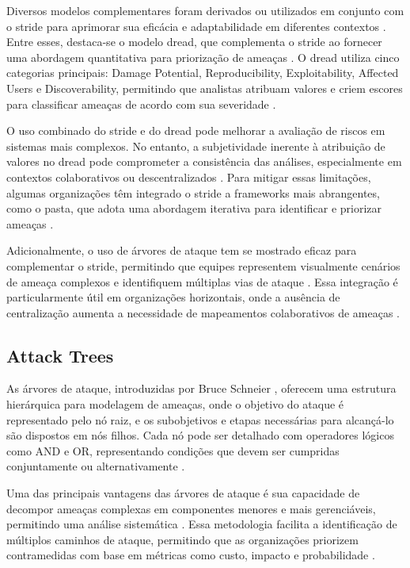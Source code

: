 Diversos modelos complementares foram derivados ou utilizados em
conjunto com o \gls{stride} para aprimorar sua eficácia e adaptabilidade em
diferentes contextos \cite{SoftwareandattackcentricThreatModeling}.
Entre esses, destaca-se o modelo \gls{dread}, que
complementa o \gls{stride} ao fornecer uma abordagem quantitativa para
priorização de ameaças \cite{DREADful}. O \gls{dread} utiliza cinco
categorias principais: Damage Potential, Reproducibility,
Exploitability, Affected Users e Discoverability, permitindo que
analistas atribuam valores e criem escores
para classificar ameaças de acordo com sua severidade
\cite{SoftwareandattackcentricThreatModeling, DREADful}.

O uso combinado do \gls{stride} e do \gls{dread} pode melhorar a avaliação de
riscos em sistemas mais complexos. No entanto, a subjetividade
inerente à atribuição de valores no \gls{dread} pode comprometer a
consistência das análises, especialmente em contextos colaborativos ou
descentralizados \cite{DREADful}. Para mitigar essas limitações,
algumas organizações têm integrado o \gls{stride} a frameworks mais
abrangentes, como o \gls{pasta}, que adota uma abordagem iterativa para identificar e
priorizar ameaças \cite{SoftwareandattackcentricThreatModeling}.

Adicionalmente, o uso de árvores de ataque tem se mostrado eficaz para
complementar o \gls{stride}, permitindo que equipes representem visualmente
cenários de ameaça complexos e identifiquem múltiplas vias de ataque
\cite{FoundationsofAttackTrees}.
Essa integração é particularmente útil em organizações horizontais,
onde a ausência de centralização aumenta a necessidade de mapeamentos
colaborativos de ameaças \cite{ThreatModelingdesigningForSecurity}. 

\subsection{Attack Trees}
\label{subsec:attack_trees}

As árvores de ataque, introduzidas por Bruce Schneier
\cite{AttackTrees}, oferecem uma estrutura hierárquica para modelagem
de ameaças, onde o objetivo do ataque é representado pelo nó raiz, e
os subobjetivos e etapas necessárias para alcançá-lo são dispostos em
nós filhos. Cada nó pode ser detalhado com operadores lógicos como AND
e OR, representando condições que devem ser cumpridas conjuntamente ou
alternativamente \cite{FoundationsofAttackTrees}.

Uma das principais vantagens das árvores de ataque é sua capacidade de
decompor ameaças complexas em componentes menores e mais gerenciáveis,
permitindo uma análise sistemática \cite{Energytheftdetectionissues}.
Essa metodologia facilita a identificação de múltiplos caminhos de
ataque, permitindo que as organizações priorizem contramedidas com
base em métricas como custo, impacto e probabilidade
\cite{AnAttackTreeBasedRisk}.

